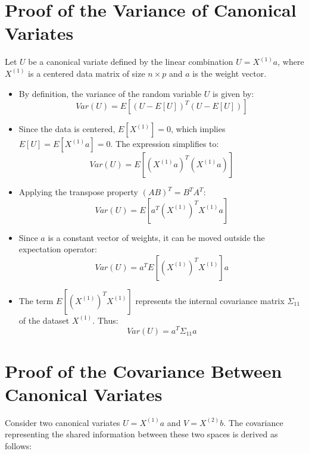 
\section{Proof of the Variance of Canonical Variates}

Let $U$ be a canonical variate defined by the linear combination $U = X^{(1)}a$, where $X^{(1)}$ is a centered data matrix of size $n \times p$ and $a$ is the weight vector.

\begin{itemize}
    \item By definition, the variance of the random variable $U$ is given by:
    \begin{equation}
        Var(U) = E[(U - E[U])^T(U - E[U])]
    \end{equation}
    \item Since the data is centered, $E[X^{(1)}] = 0$, which implies $E[U] = E[X^{(1)}a] = 0$. The expression simplifies to:
    \begin{equation}
        Var(U) = E[(X^{(1)}a)^T(X^{(1)}a)]
    \end{equation}
    \item Applying the transpose property $(AB)^T = B^T A^T$:
    \begin{equation}
        Var(U) = E[a^T (X^{(1)})^T X^{(1)} a]
    \end{equation}
    \item Since $a$ is a constant vector of weights, it can be moved outside the expectation operator:
    \begin{equation}
        Var(U) = a^T E[(X^{(1)})^T X^{(1)}] a
    \end{equation}
    \item The term $E[(X^{(1)})^T X^{(1)}]$ represents the internal covariance matrix $\Sigma_{11}$ of the dataset $X^{(1)}$. Thus:
    \begin{equation}
        Var(U) = a^T \Sigma_{11} a
    \end{equation}
\end{itemize}

\section{Proof of the Covariance Between Canonical Variates}

Consider two canonical variates $U = X^{(1)}a$ and $V = X^{(2)}b$. The covariance representing the shared information between these two spaces is derived as follows:

